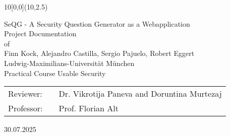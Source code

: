 \documentclass{thesisclass}
\newcommand{\type}{Project Documentation}
\newcommand{\group}{Finn Kock, Alejandro Castilla, Sergio Pajuelo, Robert Eggert}
\newcommand{\mytitle}{SeQG - A Security Question Generator as a Webapplication}
\newcommand{\course}{Practical Course Usable Security}
\newcommand{\reviewerone}{Dr. Vikrotija Paneva and Doruntina Murtezaj}
\newcommand{\prof}{Prof. Florian Alt}
\newcommand{\timeend}{30.07.2025}
\begin{document}
\begin{titlepage}
	\begin{textblock}{10}[0,0](10,2.5)
	\end{textblock}
	\vspace*{3cm}
	\begin{center}
		\Huge{\mytitle}
		\vspace*{1.6cm}\\ %
		\Large{
			\type\\of
		}\\
		\vspace*{1cm}
		\huge{\group}\\
		\vspace*{1cm} %
		\Large{
			{Ludwig-Maximilians-Universität München}
			\\
			\course
		}
	\end{center}
	\vspace*{1.8cm} %
	\Large{
		\begin{center}
			\begin{tabular}[ht]{l c l}

				Reviewer: & \hfill  & \reviewerone\\
                Professor: & \hfill & \prof
			
			\end{tabular}
		\end{center}
	}
	
	
	\vspace{1.8cm} %
	\begin{center}
		\timeend
	\end{center}
	
	
	
\end{titlepage}
\clearpage




\end{document}
